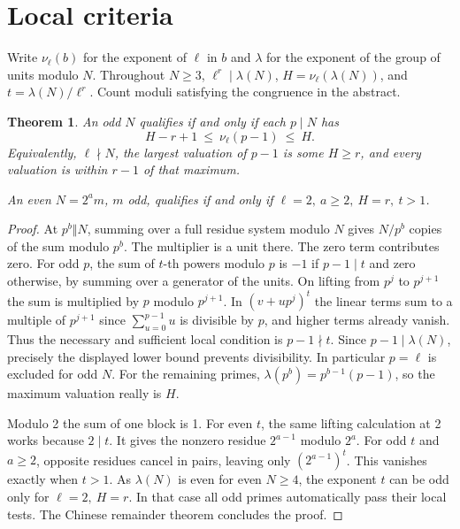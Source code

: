 \documentclass[11pt,letterpaper]{article}
\newtheorem{theorem}{Theorem}
\begin{document}
\section{Local criteria}
Write \(\nu_\ell(b)\) for the exponent of \(\ell\) in \(b\) and \(\lambda\) for the exponent of the group of units modulo \(N\). Throughout \(N\ge3\), \(\ell^r\mid\lambda(N)\), \(H=\nu_\ell(\lambda(N))\), and \(t=\lambda(N)/\ell^r\). Count moduli satisfying the congruence in the abstract.
\begin{theorem}\label{th:crit}
An odd \(N\) qualifies if and only if each \(p\mid N\) has
\[
 H-r+1\ \le\ \nu_\ell(p-1)\ \le\ H.
\]
Equivalently, \(\ell\nmid N\), the largest valuation of \(p-1\) is some \(H\ge r\), and every valuation is within \(r-1\) of that maximum.

An even \(N=2^a m\), \(m\) odd, qualifies if and only if \(\ell=2,\ a\ge2,\ H=r,\ t>1\).
\end{theorem}
\begin{proof}
At \(p^b\Vert N\), summing over a full residue system modulo \(N\) gives \(N/p^b\) copies of the sum modulo \(p^b\). The multiplier is a unit there. The zero term contributes zero. For odd \(p\), the sum of \(t\)-th powers modulo \(p\) is \(-1\) if \(p-1\mid t\) and zero otherwise, by summing over a generator of the units. On lifting from \(p^j\) to \(p^{j+1}\) the sum is multiplied by \(p\) modulo \(p^{j+1}\). In \((v+u p^j)^t\) the linear terms sum to a multiple of \(p^{j+1}\) since \(\sum_{u=0}^{p-1}u\) is divisible by \(p\), and higher terms already vanish. Thus the necessary and sufficient local condition is \(p-1\nmid t\). Since \(p-1\mid\lambda(N)\), precisely the displayed lower bound prevents divisibility. In particular \(p=\ell\) is excluded for odd \(N\). For the remaining primes, \(\lambda(p^b)=p^{b-1}(p-1)\), so the maximum valuation really is \(H\).

Modulo 2 the sum of one block is 1. For even \(t\), the same lifting calculation at 2 works because \(2\mid t\). It gives the nonzero residue \(2^{a-1}\) modulo \(2^a\). For odd \(t\) and \(a\ge2\), opposite residues cancel in pairs, leaving only \((2^{a-1})^t\). This vanishes exactly when \(t>1\). As \(\lambda(N)\) is even for even \(N\ge4\), the exponent \(t\) can be odd only for \(\ell=2,\ H=r\). In that case all odd primes automatically pass their local tests. The Chinese remainder theorem concludes the proof.
\end{proof}
\end{document}
